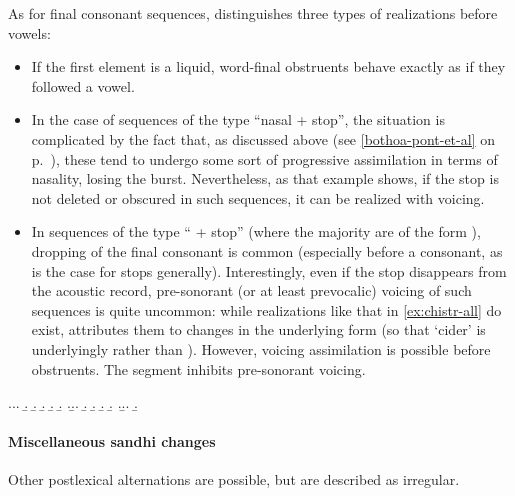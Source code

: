 As for final consonant sequences, \citet[p.~196]{humphreys95:_phonol_bothoa_saint_nicol_pelem} distinguishes three types of realizations before vowels:

\begin{itemize}
\item If the first element is a liquid,  word-final obstruents behave exactly as if they followed a vowel.
\item In the case of sequences of the type \enquote{nasal + stop}, the situation is complicated by the fact that, as discussed above (see \cref{bothoa-pont-et-al} on p.~\pageref{bothoa-pont-et-al}), these tend to undergo some sort of progressive assimilation in terms of nasality, losing the burst. Nevertheless, as that example shows, if the stop is not deleted or obscured in such sequences, it can be realized with voicing.
\item In sequences of the type \enquote{ + stop} (where the majority are of the form ), dropping of the final consonant is common (especially before a consonant, as is the case for stops generally). Interestingly, even if the stop disappears from the acoustic record, pre-sonorant (or at least prevocalic) voicing of such sequences is quite uncommon: while realizations like that in \cref{ex:chistr-all} do exist, \citet{humphreys95:_phonol_bothoa_saint_nicol_pelem} attributes them to changes in the underlying form (so that \eg `cider' is underlyingly  rather than ). However, voicing assimilation is possible before obstruents. The segment \ipa{[h]} inhibits pre-sonorant voicing.

\end{itemize}

\ex.\a.\a.
\b.
\b.
\b.
\b.
\b.
\z.\b.\a.
\b.
\b.
\b.
\b.\label{ex:chistr-all}
\z.\b.\a.
\b.

\paragraph{Miscellaneous sandhi changes}
\label{sec:misc-sandhi-chang}

Other postlexical alternations are possible, but are described as irregular.

